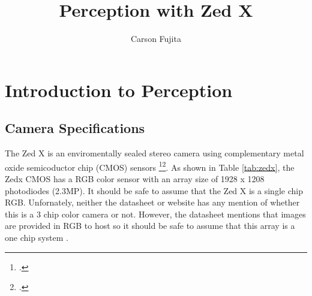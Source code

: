 \documentclass[twocolumn, letterpaper]{scrartcl}
\begin{document}
	\title{Perception with Zed X}
	\author{Carson Fujita}
	\date{}

	\maketitle
	\section*{Introduction to Perception}
	\lipsum[1]
	\subsection*{Camera Specifications}
	The Zed X is an enviromentally sealed stereo camera using complementary metal oxide semicoductor chip (CMOS) sensors \footcite{StereoLabs_2023}\footcite[paragraph 1]{Neousys}.
	As shown in Table \ref{tab:zedx}, the Zedx CMOS has a RGB color sensor with an array size of 1928 x 1208 photodiodes (2.3MP). It should be safe to assume that the Zed X is a single chip RGB. Unfornately, neither the datasheet or website has any mention of whether this is a 3 chip color camera or not. However, the datasheet mentions that images are provided in RGB to host so it should be safe to assume that this array is a one chip system \parencite[p.4-5]{StereoLabs_2023}.

	\cameraspecs
\end{document}
